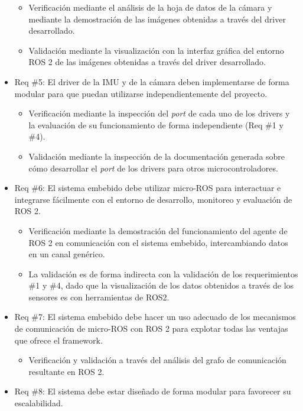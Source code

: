 \documentclass[
11pt, %
codirector, %
]{charter}
\begin{document}
\begin{itemize}
	\begin{itemize}
		\item Verificación mediante el análisis de la hoja de datos de la cámara y mediante la demostración de las imágenes obtenidas a través del driver desarrollado.
		\item Validación mediante la visualización con la interfaz gráfica del entorno ROS 2 de las imágenes obtenidas a través del driver desarrollado.
	\end{itemize}
	\item Req \#5: El driver de la IMU y de la cámara deben implementarse de forma modular para que puedan utilizarse independientemente del proyecto.
	\begin{itemize}
		\item Verificación mediante la inspección del \textit{port} de cada uno de los drivers y la evaluación de su funcionamiento de forma independiente (Req \#1 y \#4).
		\item Validación mediante la inspección de la documentación generada sobre cómo desarrollar el \textit{port} de los drivers para otros microcontroladores.
	\end{itemize}
	\item Req \#6: El sistema embebido debe utilizar micro-ROS para interactuar e integrarse fácilmente con el entorno de desarrollo, monitoreo y evaluación de ROS 2.
	\begin{itemize}
		\item Verificación mediante la demostración del funcionamiento del agente de ROS 2 en comunicación con el sistema embebido, intercambiando datos en un canal genérico.
		\item La validación es de forma indirecta con la validación de los requerimientos \#1 y \#4, dado que la visualización de los datos obtenidos a través de los sensores es con herramientas de ROS2.
	\end{itemize}
	\item Req \#7: El sistema embebido debe hacer un uso adecuado de los mecanismos de comunicación de micro-ROS con ROS 2 para explotar todas las ventajas que ofrece el framework.
	\begin{itemize}
		\item Verificación y validación a través del análisis del grafo de comunicación resultante en ROS 2. 
	\end{itemize}
	\item Req \#8: El sistema debe estar diseñado de forma modular para favorecer su escalabilidad.
	\begin{itemize}

\end{itemize}
\end{itemize}
\end{document}
